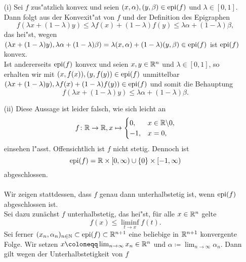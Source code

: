 \begin{itemize}
 \item[(i)] Sei $f$ zus"atzlich konvex und seien $(x,\alpha),(y,\beta)\in\operatorname{epi}(f)$ und $\lambda\in[0,1]$.
 Dann folgt aus der Konvexit"at von $f$ und der Definition des Epigraphen
 \begin{displaymath}
  f(\lambda x+(1-\lambda)y)\leq \lambda f(x)+(1-\lambda)f(y)\leq \lambda\alpha+(1-\lambda)\beta,
 \end{displaymath}
 das hei"st, wegen $(\lambda x+(1-\lambda)y),\lambda\alpha+(1-\lambda)\beta)=\lambda(x,\alpha)+(1-\lambda)(y,\beta)\in\operatorname{epi}(f)$
 ist $\operatorname{epi}(f)$ konvex.\\
 Ist andererseits $\operatorname{epi}(f)$ konvex und seien $x,y\in\mathbb{R}^n$ und $\lambda\in[0,1]$, so erhalten wir mit
 $(x,f(x)),(y,f(y))\in\operatorname{epi}(f)$ unmittelbar $(\lambda x+(1-\lambda)y),\lambda f(x)+(1-\lambda)f(y))\in \operatorname{epi}(f)$ und somit die Behauptung
 \begin{displaymath}
  f(\lambda x+(1-\lambda)y)\leq\lambda\alpha+(1-\lambda)\beta.
 \end{displaymath}
 \item[(ii)] Diese Aussage ist leider falsch, wie sich leicht an 
 \begin{displaymath}
  f\colon\mathbb{R}\to\mathbb{R}, x\mapsto \begin{cases}
                       0, &x\in\mathbb{R}\backslash{0},\\
                       -1, &x=0,
                      \end{cases}
 \end{displaymath}
 einsehen l"asst. Offensichtlich ist $f$ nicht stetig. Dennoch ist 
 \begin{displaymath}
  \operatorname{epi}(f)=\mathbb{R}\times[0,\infty)\cup\{0\}\times[-1,\infty)
 \end{displaymath}
 abgeschlossen.
 \\ \\
 Wir zeigen stattdessen, dass $f$ genau dann unterhalbstetig ist, wenn $\operatorname{epi}(f)$ abgeschlossen ist.\\
 Sei dazu zunächst $f$ unterhalbstetig, das hei"st, für alle $x\in\mathbb{R}^n$ gelte 
 \begin{displaymath}
  f(x)\leq\liminf_{t\to x}f(t).
 \end{displaymath}
 Sei ferner $(x_n,\alpha_n)_{n\in\mathbb{N}}\subset\operatorname{epi}(f)\subset\mathbb{R}^{n+1}$ eine beliebige in $\mathbb{R}^{n+1}$ konvergente Folge.
 Wir setzen $x\coloneqq \lim_{n\to\infty} x_n\in\Rn$ und $\alpha\coloneqq\lim_{n\to\infty}\alpha_n$. Dann gilt
 wegen der Unterhalbstetigkeit von $f$
 \begin{displaymath}

\end{displaymath}
\end{itemize}
